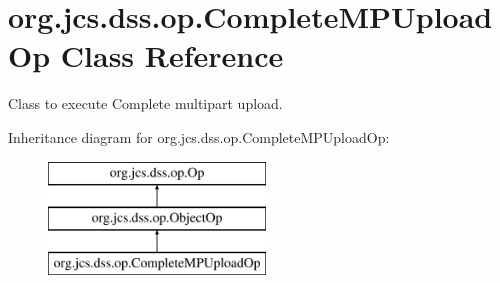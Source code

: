 \hypertarget{classorg_1_1jcs_1_1dss_1_1op_1_1CompleteMPUploadOp}{}\section{org.\+jcs.\+dss.\+op.\+Complete\+M\+P\+Upload\+Op Class Reference}
\label{classorg_1_1jcs_1_1dss_1_1op_1_1CompleteMPUploadOp}


Class to execute Complete multipart upload.  


Inheritance diagram for org.\+jcs.\+dss.\+op.\+Complete\+M\+P\+Upload\+Op\+:\begin{figure}[H]
\begin{center}
\leavevmode
\includegraphics[height=3.000000cm]{classorg_1_1jcs_1_1dss_1_1op_1_1CompleteMPUploadOp}
\end{center}
\end{figure}
